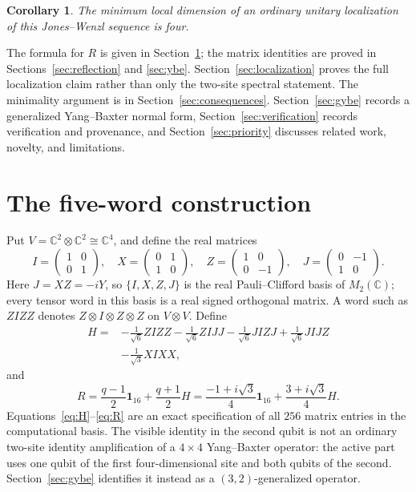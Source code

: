 \documentclass[11pt]{article}
\newtheorem{corollary}[theorem]{Corollary}
\theoremstyle{remark}
\newcommand{\Id}{\mathbf 1}
\newcommand{\bbC}{\mathbb C}
\begin{document}
\begin{corollary}\label{cor:minimal}
The minimum local dimension of an ordinary unitary localization of this
Jones--Wenzl sequence is four.
\end{corollary}

The formula for \(R\) is given in Section~\ref{sec:construction}; the matrix
identities are proved in Sections~\ref{sec:reflection} and
\ref{sec:ybe}.  Section~\ref{sec:localization} proves the full localization
claim rather than only the two-site spectral statement.  The minimality
argument is in Section~\ref{sec:consequences}.  Section~\ref{sec:gybe}
records a generalized Yang--Baxter normal form,
Section~\ref{sec:verification} records verification and provenance, and
Section~\ref{sec:priority} discusses related work, novelty, and limitations.

\section{The five-word construction}\label{sec:construction}

Put \(V=\bbC^2\otimes\bbC^2\cong\bbC^4\), and define the real matrices
\[
  I=\begin{pmatrix}1&0\\0&1\end{pmatrix},\quad
  X=\begin{pmatrix}0&1\\1&0\end{pmatrix},\quad
  Z=\begin{pmatrix}1&0\\0&-1\end{pmatrix},\quad
  J=\begin{pmatrix}0&-1\\1&0\end{pmatrix}.
\]
Here \(J=XZ=-iY\), so \(\{I,X,Z,J\}\) is the real Pauli--Clifford basis of
\(M_2(\bbC)\); every tensor word in this basis is a real signed orthogonal
matrix.
A word such as \(ZIZZ\) denotes
\(Z\otimes I\otimes Z\otimes Z\) on \(V\otimes V\).  Define
\begin{equation}
\begin{split}
  H={}&-\frac1{\sqrt6}ZIZZ-\frac1{\sqrt6}ZIJJ
        -\frac1{\sqrt6}JIZJ+\frac1{\sqrt6}JIJZ\\
      &-\frac1{\sqrt3}XIXX,
  \label{eq:H}
\end{split}
\end{equation}
and
\begin{equation}
  R=\frac{q-1}{2}\Id_{16}+\frac{q+1}{2}H
   =\frac{-1+i\sqrt3}{4}\Id_{16}
    +\frac{3+i\sqrt3}{4}H.
  \label{eq:R}
\end{equation}
Equations~\eqref{eq:H}--\eqref{eq:R} are an exact specification of all
\(256\) matrix entries in the computational basis.
The visible identity in the second qubit is not an ordinary two-site identity
amplification of a \(4\times4\) Yang--Baxter operator: the active part uses one
qubit of the first four-dimensional site and both qubits of the second.
Section~\ref{sec:gybe} identifies it instead as a \((3,2)\)-generalized
operator.
\end{document}
